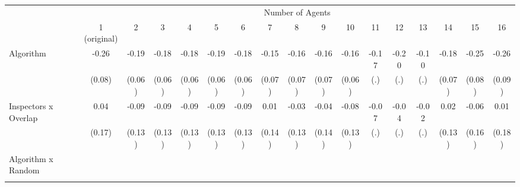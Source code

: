 \begin{tabular}{lcccccccccccccccc} \toprule
\multicolumn{1}{l}{} & \multicolumn{16}{c}{Number of Agents} \\\cmidrule(lr){2-17} \multicolumn{1}{l}{} & 1 (original) & 2 & 3 & 4 & 5 & 6 & 7 & 8 & 9 & 10 & 11 & 12 & 13 & 14 & 15 & 16 \\ \midrule
Algorithm   &       -0.26\sym{***}&       -0.19\sym{***}&       -0.18\sym{***}&       -0.18\sym{***}&       -0.19\sym{***}&       -0.18\sym{***}&       -0.15\sym{**} &       -0.16\sym{**} &       -0.16\sym{**} &       -0.16\sym{**} &       -0.17         &       -0.20         &       -0.10         &       -0.18\sym{**} &       -0.25\sym{***}&       -0.26\sym{***}\\
            &      (0.08)         &      (0.06)         &      (0.06)         &      (0.06)         &      (0.06)         &      (0.06)         &      (0.07)         &      (0.07)         &      (0.07)         &      (0.06)         &         (.)         &         (.)         &         (.)         &      (0.07)         &      (0.08)         &      (0.09)         \\
\addlinespace
Inspectors x Overlap&        0.04         &       -0.09         &       -0.09         &       -0.09         &       -0.09         &       -0.09         &        0.01         &       -0.03         &       -0.04         &       -0.08         &       -0.07         &       -0.04         &       -0.02         &        0.02         &       -0.06         &        0.01         \\
            &      (0.17)         &      (0.13)         &      (0.13)         &      (0.13)         &      (0.13)         &      (0.13)         &      (0.14)         &      (0.13)         &      (0.14)         &      (0.13)         &         (.)         &         (.)         &         (.)         &      (0.13)         &      (0.16)         &      (0.18)         \\
\addlinespace
Algorithm x Random&                     &                     &                     &                     &                     &                     &                     &                     &                     &                     &                     &                     &                     &                     &                     &                     \\
            &                     &                     &                     &                     &                     &                     &                     &                     &                     &                     &                     &                     &                     &                     &                     &                     \\

\end{tabular}
